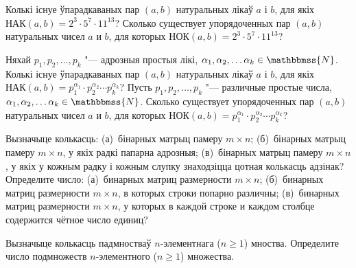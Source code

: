 \begin{problemList}
\problemItemSimple
{Колькі існуе ўпарадкаваных пар $(a,b)$ натуральных лікаў $a$ і $b$, для якіх $\text{НАК}(a,b) = 2^{3} \cdot 5^{7}\cdot 11^{13}$?}
{Сколько существует упорядоченных пар $(a,b)$ натуральных чисел $a$ и $b$, для которых $\text{НОК}(a,b) = 2^{3} \cdot 5^{7}\cdot 11^{13}$?}

\bigskip

\problemItemSimple
{Няхай $p_{1}, p_{2}, \dots, p_{k}$ "--- адрозныя простыя лікі, $\alpha_{1}, \alpha_{2}, \dots \alpha_{k} \in \mathbbmss{N}$. Колькі існуе ўпарадкаваных пар $(a,b)$  натуральных лікаў $a$ і $b$, для якіх $\text{НАК}(a,b) = p_{1} ^{\alpha_{1}} \cdot p_{2} ^{\alpha_{2}} \cdots p_{k} ^{\alpha_{k}}$?}
{Пусть $p_{1}, p_{2}, \dots, p_{k}$ "--- различные простые числа, $\alpha_{1}, \alpha_{2}, \dots \alpha_{k} \in \mathbbmss{N}$. Сколько существует упорядоченных пар $(a,b)$ натуральных чисел $a$ и $b$, для которых $\text{НОК}(a,b) = p_{1} ^{\alpha_{1}} \cdot p_{2} ^{\alpha_{2}} \cdots p_{k} ^{\alpha_{k}}$?}

\bigskip

\problemItemSimple
{Вызначыце колькасць: (а)~бінарных матрыц памеру $m \times n$; (б)~бінарных матрыц памеру $m \times n$, у якіх радкі папарна адрозныя; (в)~бінарных матрыц памеру $m \times n$, у якіх у кожным радку і кожным слупку знаходзіцца цотная колькасць адзінак?}
{Определите число: (а)~бинарных матриц размерности $m \times n$; (б)~бинарных матриц размерности $m \times n$, в которых строки попарно различны; (в)~бинарных матриц размерности $m \times n$, у которых в каждой строке и каждом столбце содержится чётное число единиц?}

\bigskip

\problemItemSimple
{Вызначыце колькасць падмностваў $n$-элементнага ($n \ge 1$) мноства.}
{Определите число подмножеств $n$-элементного ($n \ge 1$) множества.}

\end{problemList}


